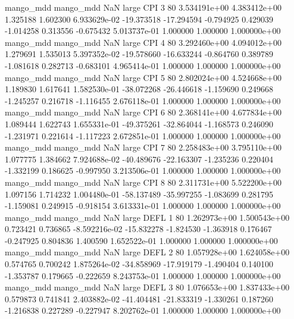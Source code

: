 mango_mdd mango_mdd                   NaN      large      CPI                 3 80 3.534191e+00   4.383412e+00      1.325188       1.602300  6.933629e-02    -19.373518    -17.294594    -0.794925       0.429039 -1.014258   0.313556    -0.675432   5.013737e-01            1.000000        1.000000        1.000000e+00
mango_mdd mango_mdd                   NaN      large      CPI                 4 80 3.292460e+00   4.094012e+00      1.279691       1.535013  5.397352e-02    -19.578660    -16.633244    -0.864760       0.389789 -1.081618   0.282713    -0.683101   4.965414e-01            1.000000        1.000000        1.000000e+00
mango_mdd mango_mdd                   NaN      large      CPI                 5 80 2.802024e+00   4.524668e+00      1.189830       1.617641  1.582530e-01    -38.072268    -26.446618    -1.159690       0.249668 -1.245257   0.216718    -1.116455   2.676118e-01            1.000000        1.000000        1.000000e+00
mango_mdd mango_mdd                   NaN      large      CPI                 6 80 2.368141e+00   4.677834e+00      1.089444       1.622743  1.655331e-01    -49.375261    -32.864044    -1.168573       0.246090 -1.231971   0.221614    -1.117223   2.672851e-01            1.000000        1.000000        1.000000e+00
mango_mdd mango_mdd                   NaN      large      CPI                 7 80 2.258483e+00   3.795110e+00      1.077775       1.384662  7.924688e-02    -40.489676    -22.163307    -1.235236       0.220404 -1.332199   0.186625    -0.997950   3.213506e-01            1.000000        1.000000        1.000000e+00
mango_mdd mango_mdd                   NaN      large      CPI                 8 80 2.311731e+00   5.522200e+00      1.097156       1.714232  1.004480e-01    -58.137489    -35.997255    -1.083699       0.281795 -1.159081   0.249915    -0.918154   3.613331e-01            1.000000        1.000000        1.000000e+00
mango_mdd mango_mdd                   NaN      large     DEFL                 1 80 1.262973e+00   1.500543e+00      0.723421       0.736865 -8.592216e-02    -15.832278     -1.824530    -1.363918       0.176467 -0.247925   0.804836     1.400590   1.652522e-01            1.000000        1.000000        1.000000e+00
mango_mdd mango_mdd                   NaN      large     DEFL                 2 80 1.057928e+00   1.624058e+00      0.574765       0.700242  1.875264e-02    -34.858969    -17.919179    -1.490404       0.140100 -1.353787   0.179665    -0.222659   8.243753e-01            1.000000        1.000000        1.000000e+00
mango_mdd mango_mdd                   NaN      large     DEFL                 3 80 1.076653e+00   1.837433e+00      0.579873       0.741841  2.403882e-02    -41.404481    -21.833319    -1.330261       0.187260 -1.216838   0.227289    -0.227947   8.202762e-01            1.000000        1.000000        1.000000e+00

